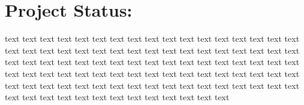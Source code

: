 \documentclass{article}
\begin{document}
\begin{center}
\end{center}

\vspace*{1.5 cm}

\section*{Project Status:}  %
text text text text text text text text text text text text text text
text text text text text text text text text text text text text text
text text text text text text text text text text text text text text
text text text text text text text text text text text text text text
text text text text text text text text text text text text text text
text text text text text text text text text text text text text text
text text text text text text text text text text text text text text
\end{document}
